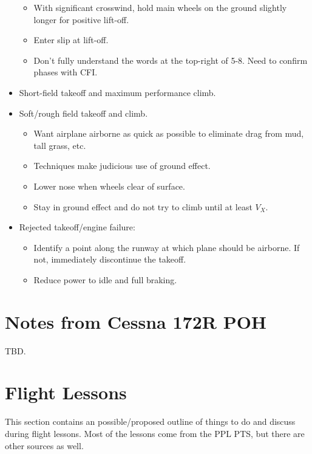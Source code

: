 \documentclass[letterpaper,10pt,titlepage]{article}
\begin{document}
\begin{itemize}
\begin{itemize}
      \item With significant crosswind, hold main wheels on the ground slightly longer
	        for positive lift-off.
      \item Enter slip at lift-off.
      \item Don't fully understand the words at the top-right of 5-8.  Need
	        to confirm phases with CFI.
	  \end{itemize}
\item Short-field takeoff and maximum performance climb.
\item Soft/rough field takeoff and climb.
      \begin{itemize}
      \item Want airplane airborne as quick as possible to eliminate drag from mud, tall
	        grass, etc.
	  \item Techniques make judicious use of ground effect.
      \item Lower nose when wheels clear of surface.
      \item Stay in ground effect and do not try to climb until at least $V_X$.
	  \end{itemize}
\item Rejected takeoff/engine failure:
      \begin{itemize}
      \item Identify a point along the runway at which plane should be airborne.  If not,
	        immediately discontinue the takeoff.
	  \item Reduce power to idle and full braking.
	  \end{itemize}
\end{itemize}


\section{Notes from Cessna 172R POH}
\label{snrc0}

TBD.



\section{Flight Lessons}
\label{sfle0}

This section contains an possible/proposed outline of things to do and discuss
during flight lessons.  Most of the lessons come from the PPL PTS, but there
are other sources as well.
\end{document}
